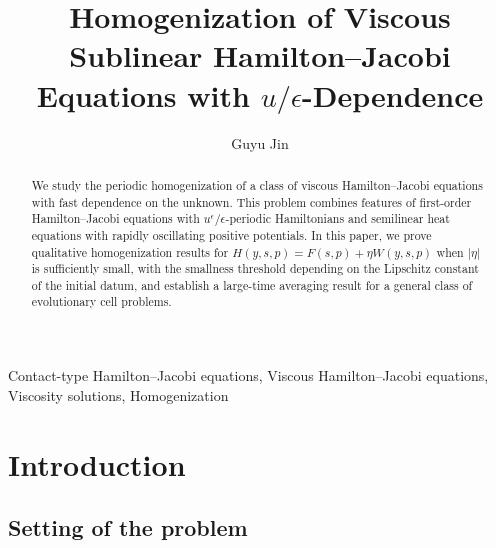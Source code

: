 \documentclass[preprint]{elsarticle}
\numberwithin{equation}{section}
\begin{document}
\baselineskip=15pt

\begin{frontmatter} %

\title{Homogenization of Viscous Sublinear Hamilton--Jacobi Equations with $u/\epsilon$-Dependence}

\author{Guyu Jin}
\address{Graduate School of Mathematical Sciences, The University of Tokyo, 3 Chome-8-1 Komaba, Meguro City, Tokyo 153-8902, Japan}


\begin{abstract}
We study the periodic homogenization of a class of viscous Hamilton--Jacobi equations with fast dependence on the unknown. This problem combines features of first-order Hamilton--Jacobi equations with \(u^\epsilon/\epsilon\)-periodic Hamiltonians and semilinear heat equations with rapidly oscillating positive potentials. In this paper, we prove qualitative homogenization results for $H(y,s,p)=F(s,p)+\eta W(y,s,p)$ when $|\eta|$ is sufficiently small, with the smallness threshold depending on the Lipschitz constant of the initial datum, and establish a large-time averaging result for a general class of evolutionary cell problems.
\end{abstract}
\begin{keyword}
Contact-type Hamilton--Jacobi equations, Viscous Hamilton--Jacobi equations, Viscosity solutions, Homogenization %
\end{keyword}

\end{frontmatter}


\section{Introduction}

\subsection{Setting of the problem}
\end{document}
